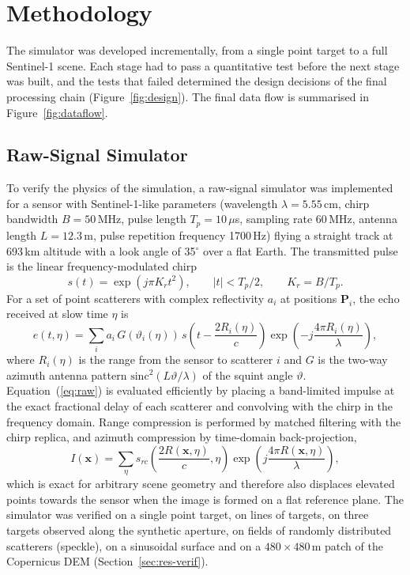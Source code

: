 \documentclass[10pt,a4paper]{article}
\begin{document}
\section{Methodology}
\label{sec:method}
The simulator was developed incrementally, from a single point target to a full Sentinel-1 scene. Each stage had to pass a quantitative test before the next stage was built, and the tests that failed determined the design decisions of the final processing chain (Figure~\ref{fig:design}). The final data flow is summarised in Figure~\ref{fig:dataflow}.

\subsection{Raw-Signal Simulator}
\label{sec:raw}
To verify the physics of the simulation, a raw-signal simulator was implemented for a sensor with Sentinel-1-like parameters (wavelength $\lambda=5.55$\,cm, chirp bandwidth $B=50$\,MHz, pulse length $T_p=10\,\mu$s, sampling rate 60\,MHz, antenna length $L=12.3$\,m, pulse repetition frequency 1700\,Hz) flying a straight track at 693\,km altitude with a look angle of 35$^\circ$ over a flat Earth. The transmitted pulse is the linear frequency-modulated chirp
\begin{equation}
s(t)=\exp\!\left(j\pi K_r t^2\right),\qquad |t|<T_p/2,\qquad K_r=B/T_p .
\end{equation}
For a set of point scatterers with complex reflectivity $a_i$ at positions $\mathbf{P}_i$, the echo received at slow time $\eta$ is
\begin{equation}
e(t,\eta)=\sum_i a_i\,G\!\left(\vartheta_i(\eta)\right)\,s\!\left(t-\frac{2R_i(\eta)}{c}\right)\exp\!\left(-j\frac{4\pi R_i(\eta)}{\lambda}\right),
\label{eq:raw}
\end{equation}
where $R_i(\eta)$ is the range from the sensor to scatterer $i$ and $G$ is the two-way azimuth antenna pattern $\mathrm{sinc}^2(L\vartheta/\lambda)$ of the squint angle $\vartheta$. Equation~(\ref{eq:raw}) is evaluated efficiently by placing a band-limited impulse at the exact fractional delay of each scatterer and convolving with the chirp in the frequency domain. Range compression is performed by matched filtering with the chirp replica, and azimuth compression by time-domain back-projection,
\begin{equation}
I(\mathbf{x})=\sum_{\eta} s_{rc}\!\left(\frac{2R(\mathbf{x},\eta)}{c},\eta\right)\exp\!\left(j\frac{4\pi R(\mathbf{x},\eta)}{\lambda}\right),
\end{equation}
which is exact for arbitrary scene geometry and therefore also displaces elevated points towards the sensor when the image is formed on a flat reference plane. The simulator was verified on a single point target, on lines of targets, on three targets observed along the synthetic aperture, on fields of randomly distributed scatterers (speckle), on a sinusoidal surface and on a $480\times480$\,m patch of the Copernicus DEM (Section~\ref{sec:res-verif}).
\end{document}
